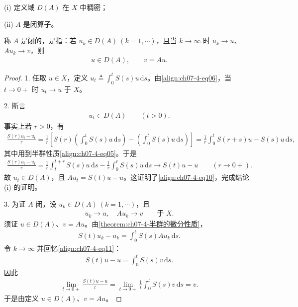 \documentclass[../../main.tex]{subfiles}
\begin{document}
\begin{theorem}[生成元的性质。]\label{theorem:ch07-4-生成元的性质}

(i) 定义域 $D(A)$ 在 $X$ 中稠密；

(ii) $A$ 是闭算子。
\end{theorem}

\begin{remark}\label{remark:ch07-4-闭算子}
称 $A$ 是闭的，是指：若 $u_k\in D(A)\ (k=1,\cdots)$，且当 $k\to\infty$ 时 $u_k\to u$、$Au_k\to v$，则
\begin{align*}
u\in D(A),\qquad v=Au.
\end{align*}
\end{remark}

\begin{proof}
1. 任取 $u\in X$，定义 $u_t\triangleq\int_0^t S(s)u\,\mathrm{d}s$。由\eqref{align:ch07-4-eq06}，当 $t\to 0+$ 时 $u_t\to u$ 于 $X$。

2. 断言
\begin{align}
u_t\in D(A)\qquad (t>0).\label{align:ch07-4-eq10}
\end{align}
事实上若 $r>0$，有
\begin{align*}
\frac{S(r)u_t-u_t}{r}
=\frac{1}{r}\left[S(r)\left(\int_0^t S(s)u\,\mathrm{d}s\right)-\left(\int_0^t S(s)u\,\mathrm{d}s\right)\right]
=\frac{1}{r}\int_0^t S(r+s)u-S(s)u\,\mathrm{d}s,
\end{align*}
其中用到半群性质\eqref{align:ch07-4-eq05}。于是
\begin{align*}
\frac{S(r)u_t-u_t}{r}
=\frac{1}{r}\int_t^{t+r}S(s)u\,\mathrm{d}s-\frac{1}{r}\int_0^r S(s)u\,\mathrm{d}s
\longrightarrow S(t)u-u\qquad (r\to 0+).
\end{align*}
故 $u_t\in D(A)$，且 $Au_t=S(t)u-u$。这证明了\eqref{align:ch07-4-eq10}，完成结论 (i) 的证明。

3. 为证 $A$ 闭，设 $u_k\in D(A)\ (k=1,\cdots)$，且
\begin{align}
u_k\to u,\quad Au_k\to v\qquad \text{于 } X.\label{align:ch07-4-eq11}
\end{align}
须证 $u\in D(A)$、$v=Au$。由\cref{theorem:ch07-4-半群的微分性质}，
\begin{align*}
S(t)u_k-u_k=\int_0^t S(s)Au_k\,\mathrm{d}s.
\end{align*}
令 $k\to\infty$ 并回忆\eqref{align:ch07-4-eq11}：
\begin{align*}
S(t)u-u=\int_0^t S(s)v\,\mathrm{d}s.
\end{align*}
因此
\begin{align*}
\lim_{t\to 0+}\frac{S(t)u-u}{t}
=\lim_{t\to 0+}\frac{1}{t}\int_0^t S(s)v\,\mathrm{d}s=v.
\end{align*}
于是由定义 $u\in D(A)$、$v=Au$。
\end{proof}
\end{document}
